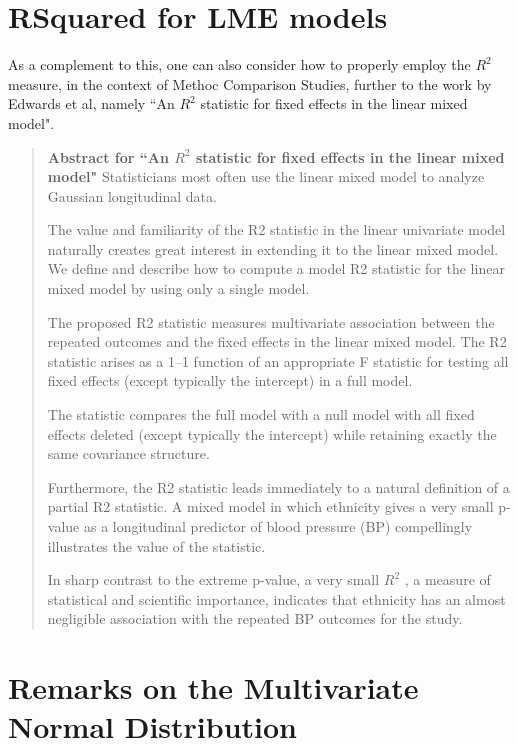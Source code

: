 \documentclass[12pt, a4paper]{report}
\theoremstyle{plain}
\theoremstyle{definition}
\theoremstyle{remark}
\begin{document}
	
	
	
	
	\section{RSquared for LME models}
	
	As a complement to this, one can also consider how to properly employ the $R^2$ measure, in the context of Methoc Comparison Studies, further to the work by Edwards et al, namely ``An $R^2$ statistic for fixed effects in the linear mixed model".
	
	\begin{framed}
		
		\begin{quote}
			\textbf{Abstract for ``An $R^2$ statistic for fixed effects in the linear mixed model"}
			Statisticians most often use the linear mixed model to analyze Gaussian longitudinal data. 
			
			The value and familiarity of the R2 statistic in the linear univariate model naturally creates great interest in extending it to the linear mixed model. We define and describe how to compute a model R2 statistic for the linear mixed model by using only a single model. 
			
			The proposed R2 statistic measures multivariate association between the repeated outcomes and the fixed effects in the linear mixed model. The R2 statistic arises as a 1–1 function of an appropriate F statistic for testing all fixed effects (except typically the intercept) in a full model. 
			
			The statistic compares the full model with a null model with all fixed effects deleted (except typically the intercept) while retaining exactly the same covariance structure. 
			
			Furthermore, the R2 statistic leads immediately to a natural definition of a partial R2 statistic. A mixed model in which ethnicity gives a very small p-value as a longitudinal predictor of blood pressure (BP) compellingly illustrates the value of the statistic. 
			
			In sharp contrast to the extreme p-value, a very small $R^2$ , a measure of statistical and scientific importance, indicates that ethnicity has an almost negligible association with the repeated BP outcomes for the study.
		\end{quote}
	\end{framed}
	
	\section{Remarks on the Multivariate Normal Distribution}
	
\end{document}
